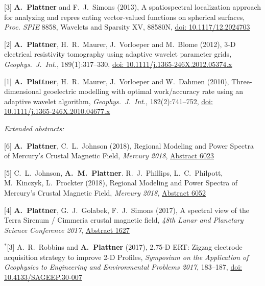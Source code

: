 \documentclass[10pt]{article}
\begin{document}
\spcp
\hspace{-0.5cm}[3] \textbf{A.~Plattner} and F.~J.~Simons (2013), 
A spatiospectral localization approach for analyzing and repres enting vector-valued functions on spherical surfaces,
\emph{Proc. SPIE} 8858, Wavelets and Sparsity XV, 88580N,
\href{http://proceedings.spiedigitallibrary.org/proceeding.aspx?articleid=1745029}{doi: 10.1117/12.2024703}

\spcp
\hspace{-0.5cm}[2] \textbf{A.~Plattner}, H.~R.~Maurer, J.~Vorloeper and M.~Blome (2012),
3-D electrical resistivity tomography using adaptive wavelet parameter grids,
\emph{Geophys.~J.~Int.}, 189(1):317--330,
\href{https://academic.oup.com/gji/article-lookup/doi/10.1111/j.1365-246X.2012.05374.x}{doi: 10.1111/j.1365-246X.2012.05374.x}

\spcp
\hspace{-0.5cm}[1] \textbf{A.~Plattner}, H.~R.~Maurer, J.~Vorloeper and W.~Dahmen (2010),
Three-dimensional geoelectric modelling with optimal work/accuracy rate 
using an adaptive wavelet algorithm,
\emph{Geophys.~J.~Int.}, 182(2):741--752,
\href{https://academic.oup.com/gji/article-lookup/doi/10.1111/j.1365-246X.2010.04677.x}{doi: 10.1111/j.1365-246X.2010.04677.x}

\spc
\emph{Extended abstracts:}

\spcp
\hspace{-0.5cm}[6] \textbf{A.~Plattner}, C.~L.~Johnson (2018),
Regional Modeling and Power Spectra of Mercury’s Crustal Magnetic Field,
\emph{Mercury 2018},
\href{https://www.hou.usra.edu/meetings/mercury2018/pdf/6023.pdf}{Abstract 6023}

\spcp
\hspace{-0.5cm}[5] C.~L.~Johnson,
\textbf{A.~M.~Plattner}. R.~J.~Phillips, L.~C.~Philpott, M.~Kinczyk,
L.~Prockter (2018), Regional Modeling and Power Spectra of Mercury’s
Crustal Magnetic Field, \emph{Mercury 2018},
\href{https://www.hou.usra.edu/meetings/mercury2018/pdf/6052.pdf}{Abstract
  6052}

\spcp
\hspace{-0.5cm}[4] \textbf{A.~Plattner}, G.~J.~Golabek, F.~J.~Simons (2017),
A spectral view of the Terra Sirenum / Cimmeria crustal magnetic
field,
\emph{48th Lunar and Planetary Science Conference 2017},
\href{http://www.lpi.usra.edu/meetings/lpsc2017/pdf/1627.pdf}{Abstract 1627}

\spcp
\hspace{-0.67cm}$^*$[3] A.~R.~Robbins and \textbf{A.~Plattner}
(2017),
2.75-D ERT: Zigzag electrode acquisition strategy to improve 2-D
Profiles,
\emph{Symposium on the Application of Geophysics to Engineering and
  Environmental Problems 2017}, 183--187,
\href{http://library.seg.org/doi/pdf/10.4133/SAGEEP.30-007}{doi: 10.4133/SAGEEP.30-007}
\end{document}
